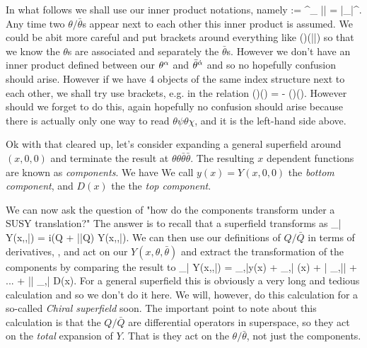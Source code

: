 \bnn 
    In what follows we shall use our inner product notations, namely 
    \bse 
        \theta\theta := \theta^{\a}\theta_{\a} \qand \bar{\theta}\bar{\theta} = \bar{\theta}_{\dot{\a}}\bar{\theta}^{\dot{\a}}.
    \ese 
    Any time two $\theta/\bar{\theta}$s appear next to each other this inner product is assumed. We could be abit more careful and put brackets around everything like 
    \bse 
        (\theta\theta)(\bar{\theta}\bar{\theta})
    \ese    
    so that we know the $\theta$s are associated and separately the $\bar{\theta}$s. However we don't have an inner product defined between our $\theta^{\alpha}$ and $\bar{\theta}^{\dot{\alpha}}$ and so no hopefully confusion should arise. However if we have 4 objects of the same index structure next to each other, we shall try use brackets, e.g. in the relation
    \bse 
        (\theta\psi)(\theta\chi) = - (\theta\theta)(\psi\chi).
    \ese 
    However should we forget to do this, again hopefully no confusion should arise because there is actually only one way to read $\theta\psi\theta\chi$, and it is the left-hand side above. 
\enn 

Ok with that cleared up, let's consider expanding a general superfield around $(x,0,0)$ and terminate the result at $\theta\theta \bar{\theta}\bar{\theta}$. The resulting $x$ dependent functions are known as \textit{components}. We have 
\noindent We call $y(x) = Y(x,0,0)$ the \textit{bottom component}, and $D(x)$ the the \textit{top component}. 

We can now ask the question of "how do the components transform under a SUSY translation?" The answer is to recall that a superfield transforms as
\bse 
    \del_{\epsilon\bar{\epsilon}} Y(x,\theta,\bar{\theta}) = i\big(\epsilon Q + \bar{\epsilon}\bar{Q}\big) Y(x,\theta,\bar{\theta}). 
\ese 
We can then use our definitions of $Q/\bar{Q}$ in terms of derivatives, , and act on our $Y(x,\theta,\bar{\theta})$ and extract the transformation of the components by comparing the result to 
\bse 
    \del_{\epsilon\bar{\epsilon}} Y(x,\theta,\bar{\theta}) = \del_{\epsilon,\bar{\epsilon}}y(x) + \theta \del_{\epsilon,\bar{\epsilon}} \psi(x) + \bar{\theta} \del_{\epsilon,\bar{\epsilon}}\bar{\chi} + ... + \theta\theta \bar{\theta}\bar{\theta} \del_{\epsilon,\bar{\epsilon}} D(x).
\ese
For a general superfield this is obviously a very long and tedious calculation and so we don't do it here. We will, however, do this calculation for a so-called \textit{Chiral superfield} soon. The important point to note about this calculation is that the $Q/\bar{Q}$ are differential operators in superspace, so they act on the \textit{total} expansion of $Y$. That is they act on the $\theta/\bar{\theta}$, not just the components.  

